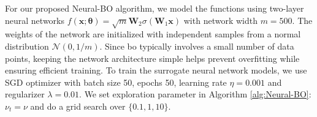 For our proposed Neural-BO algorithm, we model the functions using two-layer neural networks $f(\mathbf{x}; \boldsymbol{\theta}) = \sqrt{m}\mathbf{W}_2\sigma(\mathbf{W}_1\mathbf{x})$ with network width $m=500$. 
The weights of the network are initialized with independent samples from a normal distribution $\mathcal{N} (0, 1/m)$. Since \ac{bo} typically involves a small number of data points, keeping the network architecture simple helps prevent overfitting while ensuring efficient training.  To train the surrogate neural network models, we use SGD optimizer with batch size 50, epochs 50, learning rate $\eta=0.001$ and regularizer $\lambda=0.01$. We set exploration parameter in Algorithm \ref{alg:Neural-BO}: $\nu_t = \nu$ and do a grid search over $\{0.1,1,10\}$. 

